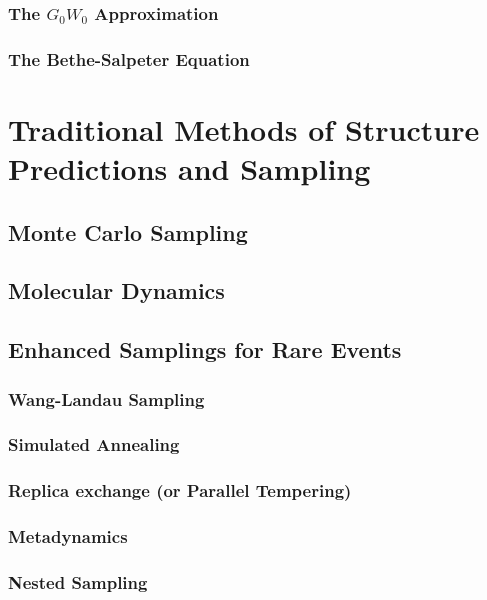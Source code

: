 \documentclass[%
aip,
rmp,
10pt, 
amsmath,
amssymb,
floatfix,
nofootinbib,
]{revtex4-2}
\begin{document}
\subsubsection{The $G_0 W_0$ Approximation}

\subsubsection{The Bethe-Salpeter Equation}

 
\section{Traditional Methods of Structure Predictions and Sampling}\label{chapter:sampling_methods}


\subsection{Monte Carlo Sampling}\label{sect:MonteCarlo}

\subsection{Molecular Dynamics}\label{sect:molecular_dynamics}


\subsection{Enhanced Samplings for Rare Events}\label{sect:enhanced_smapling}

\subsubsection{Wang-Landau Sampling} 

\subsubsection{Simulated Annealing}

\subsubsection{Replica exchange (or Parallel Tempering)}

\subsubsection{Metadynamics} 
\label{section:metaD}

\subsubsection{Nested Sampling}\label{sec:nested_sampling}

\end{document}
